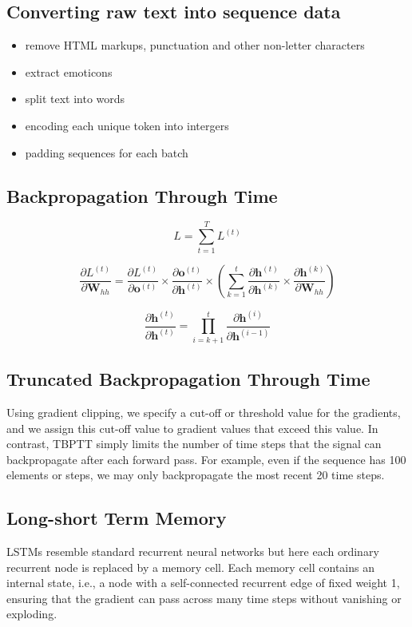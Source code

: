 \subsection{Converting raw text into sequence data}
\begin{itemize}
    \item remove HTML markups, punctuation and other non-letter characters
    \item extract emoticons
    \item split text into words
    \item encoding each unique token into intergers
    \item padding sequences for each batch
\end{itemize}


\subsection{Backpropagation Through Time}
\[L = \sum_{t=1}^T L^{(t)}\]

\[\frac{\partial L^{(t)}}{\partial \bm{W}_{hh}} = \frac{\partial L^{(t)}}{\partial \bm{o}^{(t)}} \times \frac{\partial \bm{o}^{(t)}}{\partial \bm{h}^{(t)}} \times (\sum_{k=1}^{t} \frac{\partial \bm{h}^{(t)}}{\partial \bm{h}^{(k)}} \times \frac{\partial \bm{h}^{(k)}}{\partial \bm{W}_{hh}})\]

\[\frac{\partial \bm{h}^{(t)}}{\partial \bm{h}^{(t)}} = \prod_{i=k+1}^{t} \frac{\partial \bm{h}^{(i)}}{\partial \bm{h}^{(i-1)}}\]

\subsection{Truncated Backpropagation Through Time}
Using gradient clipping, we specify a cut-off or threshold value for the gradients, and we assign this cut-off value to gradient values that exceed this value. In contrast, TBPTT simply limits the number of time steps that the signal can backpropagate after each forward pass. For example, even if the sequence has 100 elements or steps, we may only backpropagate the most recent 20 time steps.

\subsection{Long-short Term Memory}
LSTMs resemble standard recurrent neural networks but here each ordinary recurrent node is replaced by a memory cell. Each memory cell contains an internal state, i.e., a node with a self-connected recurrent edge of fixed weight 1, ensuring that the gradient can pass across many time steps without vanishing or exploding.

